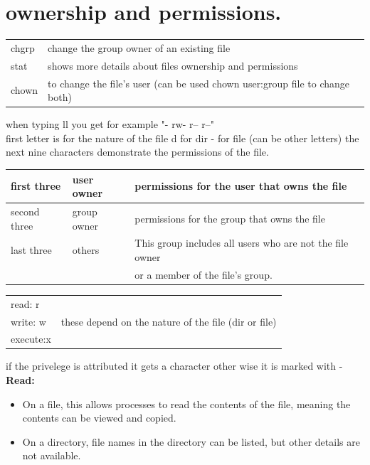 \documentclass[10pt]{article}
\begin{document}
\section{ownership and permissions.}
\begin{center}
	\begin{tabular}{l l}
		chgrp & change the group owner of an existing file
		\\stat & shows more details about files ownership and permissions
		\\chown & to change the file's user (can be used chown user:group file to change both)
	\end{tabular}
\end{center}
when typing ll you get for example "- rw- r-- r--"\\
first letter is for the nature of the file d for dir - for file (can be other letters)
the next nine characters demonstrate the permissions of the file.\\
\begin{center}
	\begin{tabular}{|l|l|l|}
		\hline first three& user owner & permissions for the user that owns the file\\
		\hline second three& group owner & permissions for the group that owns the file\\
		\hline last three& others & This group includes all users who are not the file owner\\
						 & &or a member of the file's group.\\
						 \hline
	\end{tabular}
\end{center}
\begin{center}
	\begin{tabular}{l l}
		read: r      &\\
		write: w      &these depend on the nature of the file (dir or file)\\
		execute:x &\\
	\end{tabular}
\end{center}
if the privelege is attributed it gets a character other wise it is marked with -\\
\textbf{Read:}
\begin{itemize}
	\item On a file, this allows processes to read the contents of the file, meaning the contents can be viewed and copied.
	\item On a directory, file names in the directory can be listed, but other details are not available.
\end{itemize}
\end{document}
